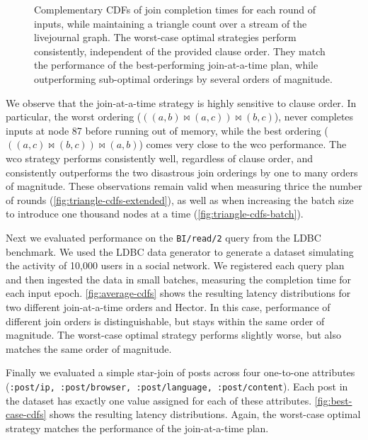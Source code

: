 \documentclass[../catalog.tex]{subfiles}
\begin{document}
\begin{figure}[h!]
  \medskip
  \small

  Complementary CDFs of join completion times for each round of
  inputs, while maintaining a triangle count over a stream of the
  livejournal graph. The worst-case optimal strategies perform
  consistently, independent of the provided clause order. They match
  the performance of the best-performing join-at-a-time plan, while
  outperforming sub-optimal orderings by several orders of magnitude.
\end{figure}

We observe that the join-at-a-time strategy is highly sensitive to
clause order. In particular, the worst ordering ($((a,b) \bowtie
(a,c)) \bowtie (b,c)$), never completes inputs at node 87 before
running out of memory, while the best ordering ($((a,c) \bowtie (b,c))
\bowtie (a,b)$) comes very close to the wco performance. The wco
strategy performs consistently well, regardless of clause order, and
consistently outperforms the two disastrous join orderings by one to
many orders of magnitude. These observations remain valid when
measuring thrice the number of rounds
(\autoref{fig:triangle-cdfs-extended}), as well as when increasing the
batch size to introduce one thousand nodes at a time
(\autoref{fig:triangle-cdfs-batch}).

Next we evaluated performance on the \texttt{BI/read/2} query from the
LDBC benchmark. We used the LDBC data generator to generate a dataset
simulating the activity of 10,000 users in a social network. We
registered each query plan and then ingested the data in small
batches, measuring the completion time for each input
epoch. \autoref{fig:average-cdfs} shows the resulting latency
distributions for two different join-at-a-time orders and Hector. In
this case, performance of different join orders is distinguishable,
but stays within the same order of magnitude. The worst-case optimal
strategy performs slightly worse, but also matches the same order of
magnitude.

Finally we evaluated a simple star-join of posts across four
one-to-one attributes (\texttt{:post/ip, :post/browser,
  :post/language, :post/content}). Each post in the dataset has
exactly one value assigned for each of these
attributes. \autoref{fig:best-case-cdfs} shows the resulting latency
distributions. Again, the worst-case optimal strategy matches the
performance of the join-at-a-time plan.
\end{document}
